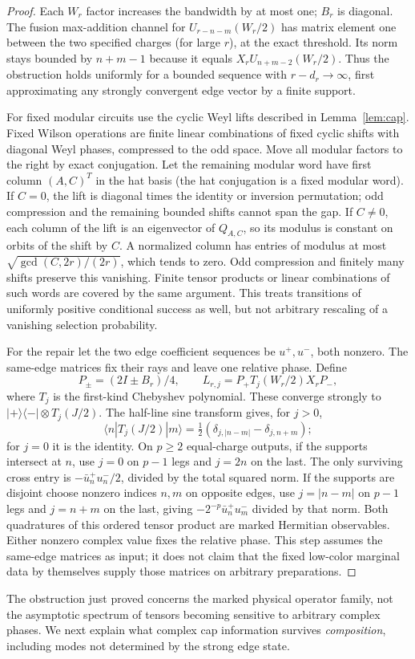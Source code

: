 \begin{proof}
Each \(W_r\) factor increases the bandwidth by at most one; \(B_r\) is diagonal. The fusion max-addition channel for \(U_{r-n-m}(W_r/2)\) has matrix element one between the two specified charges (for large \(r\)), at the exact threshold. Its norm stays bounded by \(n+m-1\) because it equals \(X_rU_{n+m-2}(W_r/2)\). Thus the obstruction holds uniformly for a bounded sequence with \(r-d_r\to\infty\), first approximating any strongly convergent edge vector by a finite support.

For fixed modular circuits use the cyclic Weyl lifts described in Lemma~\ref{lem:cap}. Fixed Wilson operations are finite linear combinations of fixed cyclic shifts with diagonal Weyl phases, compressed to the odd space. Move all modular factors to the right by exact conjugation. Let the remaining modular word have first column \((A,C)^T\) in the hat basis (the hat conjugation is a fixed modular word). If \(C=0\), the lift is diagonal times the identity or inversion permutation; odd compression and the remaining bounded shifts cannot span the gap. If \(C\ne0\), each column of the lift is an eigenvector of \(Q_{A,C}\), so its modulus is constant on orbits of the shift by \(C\). A normalized column has entries of modulus at most \(\sqrt{\gcd(C,2r)/(2r)}\), which tends to zero. Odd compression and finitely many shifts preserve this vanishing. Finite tensor products or linear combinations of such words are covered by the same argument. This treats transitions of uniformly positive conditional success as well, but not arbitrary rescaling of a vanishing selection probability.

For the repair let the two edge coefficient sequences be \(u^+,u^-\), both nonzero. The same-edge matrices fix their rays and leave one relative phase. Define
\[
 P_\pm=(2I\pm B_r)/4,\qquad
 L_{r,j}=P_+ T_j(W_r/2)X_r P_-,
\]
where \(T_j\) is the first-kind Chebyshev polynomial. These converge strongly to
\(|+\rangle\langle-|\otimes T_j(J/2)\).
The half-line sine transform gives, for \(j>0\),
\[
 \langle n|T_j(J/2)|m\rangle
 =\tfrac12(\delta_{j,|n-m|}-\delta_{j,n+m});
\]
for \(j=0\) it is the identity. On \(p\ge2\) equal-charge outputs, if the supports intersect at \(n\), use \(j=0\) on \(p-1\) legs and \(j=2n\) on the last. The only surviving cross entry is \(-\bar u_n^+u_n^-/2\), divided by the total squared norm. If the supports are disjoint choose nonzero indices \(n,m\) on opposite edges, use \(j=|n-m|\) on \(p-1\) legs and \(j=n+m\) on the last, giving \(-2^{-p}\bar u_n^+u_m^-\) divided by that norm. Both quadratures of this ordered tensor product are marked Hermitian observables. Either nonzero complex value fixes the relative phase. This step assumes the same-edge matrices as input; it does not claim that the fixed low-color marginal data by themselves supply those matrices on arbitrary preparations.
\end{proof}

The obstruction just proved concerns the marked physical operator family, not the asymptotic spectrum of tensors becoming sensitive to arbitrary complex phases. We next explain what complex cap information survives \emph{composition}, including modes not determined by the strong edge state.
